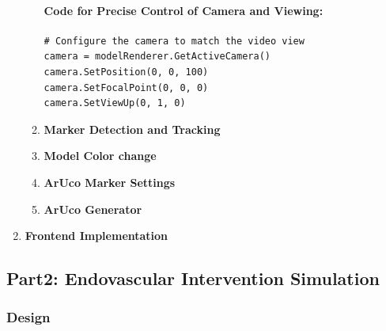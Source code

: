 \documentclass[12pt]{article}
\begin{document}
\begin{enumerate}
\begin{enumerate}
                        \paragraph{Code for Precise Control of Camera and Viewing:}
                        \begin{verbatim}
# Configure the camera to match the video view
camera = modelRenderer.GetActiveCamera()
camera.SetPosition(0, 0, 100)
camera.SetFocalPoint(0, 0, 0)
camera.SetViewUp(0, 1, 0)
                        \end{verbatim}
                  \item \textbf{Marker Detection and Tracking}

                  \item \textbf{Model Color change}
                  \item \textbf{ArUco Marker Settings}

                  \item \textbf{ArUco Generator}

            \end{enumerate}
      \item \textbf{Frontend Implementation}
\end{enumerate}

\subsection{Part2: Endovascular Intervention Simulation}

\subsubsection{Design}
\end{document}
